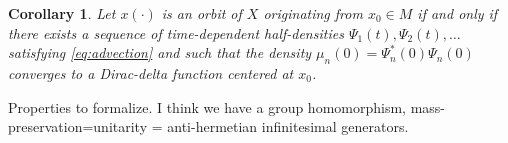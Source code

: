 \documentclass[12pt]{amsart}
\newtheorem{cor}{Corollary}
\begin{document}
  \begin{cor}
  	Let $x( \cdot )$ is an orbit of $X$ originating from $x_0 \in M$ if and only if there exists a sequence of time-dependent half-densities $\Psi_1(t) , \Psi_2(t), \dots$ satisfying \eqref{eq:advection} and such that the density $\mu_n(0) = \Psi_n^{\ast}(0) \Psi_n(0)$ converges to a Dirac-delta function centered at $x_0$.
  \end{cor}
  
  Properties to formalize.  I think we have a group homomorphism, mass-preservation=unitarity = anti-hermetian infinitesimal generators.
\end{document}
